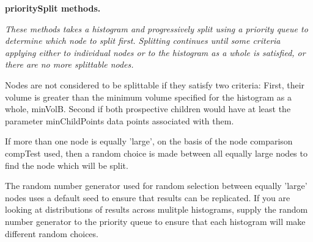 \begin{Indent}{\bf priority\-Split methods.}\par
{\em \-These methods takes a histogram and progressively split using a priority queue to determine which node to split first. \-Splitting continues until some criteria applying either to individual nodes or to the histogram as a whole is satisfied, or there are no more splittable nodes.

\-Nodes are not considered to be splittable if they satisfy two criteria\-: \-First, their volume is greater than the minimum volume specified for the histogram as a whole, min\-Vol\-B. \-Second if both prospective children would have at least the parameter min\-Child\-Points data points associated with them.

\-If more than one node is equally 'large', on the basis of the node comparison comp\-Test used, then a random choice is made between all equally large nodes to find the node which will be split.

\-The random number generator used for random selection between equally 'large' nodes uses a default seed to ensure that results can be replicated. \-If you are looking at distributions of results across mulitple histograms, supply the random number generator to the priority queue to ensure that each histogram will make different random choices.


}
\end{Indent}

